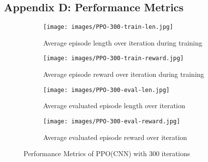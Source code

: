 \documentclass{article}
\begin{document}
\subsection*{Appendix D: Performance Metrics}

\begin{figure}[h!]
    \centering
    \begin{subfigure}{0.9\textwidth}
        \centering
        \texttt{[image: images/PPO-300-train-len.jpg]}
        \caption{Average episode length over iteration during training}
        \label{fig:PPO-300-train-len}
    \end{subfigure}
    \begin{subfigure}{0.9\textwidth}
        \centering
        \texttt{[image: images/PPO-300-train-reward.jpg]}
        \caption{Average episode reward over iteration during training}
        \label{fig:PPO-300-train-reward}
    \end{subfigure}
    \begin{subfigure}{0.9\textwidth}
        \centering
        \texttt{[image: images/PPO-300-eval-len.jpg]}
        \caption{Average evaluated episode length over iteration}
        \label{fig:PPO-300-eval-len}
    \end{subfigure}
    \begin{subfigure}{0.9\textwidth}
        \centering
        \texttt{[image: images/PPO-300-eval-reward.jpg]}
        \caption{Average evaluated episode reward over iteration}
        \label{fig:PPO-500-eval-reward}
    \end{subfigure}
    \caption{Performance Metrics of PPO(CNN) with 300 iterations}
    \label{fig:PPO-300}
\end{figure}
\end{document}
